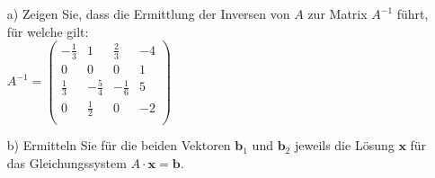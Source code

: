 \documentclass[fontsize=11pt, parskip=half]{scrartcl}
\renewcommand{\vec}[1]{\boldsymbol #1}
\begin{document}
\begin{enumerate}
\item[a)] Zeigen Sie, dass die Ermittlung der Inversen von $A$ zur Matrix $A^{-1}$ führt, für welche gilt:\\[0.3cm]
$
 A^{-1}= \left( \begin{array}{cccc}  -\frac{1}{3} & 1 & \frac{2}{3} & -4 \\[0.1cm]
                                     0 & 0 & 0 & 1 \\[0.1cm]
                                     \frac{1}{3} & -\frac{5}{4} & -\frac{1}{6} & 5 \\[0.1cm]
                                     0 & \frac{1}{2} & 0 & -2 \\ \end{array}\right)
$\\

\item[b)] Ermitteln Sie für die beiden Vektoren $\vec{b_1}$ und $\vec{b_2}$ jeweils die Lösung $\vec{x}$ für das Gleichungssystem $A \cdot \vec{x} = \vec{b}$.
\end{enumerate}
\end{document}
